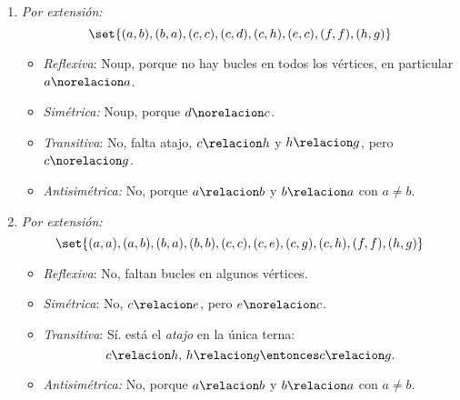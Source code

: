\begin{enumerate}[label=\roman*)]

  \item
        \begin{minipage}{0.3\textwidth}
          \diecinuevei
        \end{minipage}
        \begin{minipage}{0.7\textwidth}
          \textit{Por extensión:}
          $$
            \set{(a,b),(b,a),(c,c),(c,d),(c,h),(e,c),(f,f),(h,g)}
          $$
          \begin{itemize}
            \item \textit{Reflexiva}: Noup, porque no hay bucles en todos los vértices, en particular $a \norelacion a$.
            \item \textit{Simétrica:} Noup, porque $d \norelacion c$.
            \item \textit{Transitiva}: No, falta atajo, $c \relacion h$ y $h \relacion g$, pero $c \norelacion g$.
            \item \textit{Antisimétrica:} No, porque $a \relacion b$ y $b \relacion a$ con $a \neq b$.
          \end{itemize}
        \end{minipage}

        \bigskip

  \item
        \begin{minipage}{0.25\textwidth}
          \diecinueveii
        \end{minipage}
        \begin{minipage}{0.7\textwidth}
          \textit{Por extensión:}
          $$
            \set{(a,a),(a,b),(b,a),(b,b),(c,c),(c,e),(c,g),
              (c,h),(f,f),(h,g)}
          $$
          \begin{itemize}
            \item \textit{Reflexiva}: No, faltan bucles en algunos vértices.
            \item \textit{Simétrica}: No, $c \relacion e$, pero $e \norelacion c$.
            \item \textit{Transitiva}: Sí. está el \textit{atajo} en la única terna:
                  $$
                    c \relacion h,\, h \relacion g \entonces c \relacion g.
                  $$
            \item \textit{Antisimétrica:} No, porque $a \relacion b$ y $b \relacion a$ con $a \neq b$.
          \end{itemize}
        \end{minipage}


\end{enumerate}
